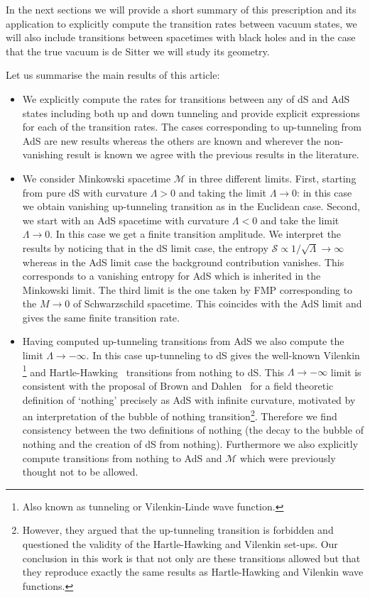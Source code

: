 \documentclass[a4paper,11pt]{article}
\numberwithin{equation}{section}
\def\S{\mathcal S}
\def\M{\mathcal M}
\numberwithin{equation}{section}
\begin{document}
In the next sections we will provide a short summary of this prescription and its application to explicitly compute the transition rates between vacuum states,  we will also include transitions between spacetimes with black holes and in the case that the true vacuum is de Sitter we will study its geometry. 
\vskip 1mm

Let us summarise the main results of this article:

\begin{itemize}
\item We explicitly compute the  rates for transitions between any of  dS and AdS states including both up and down tunneling and provide explicit expressions for each of the transition rates. The cases corresponding to up-tunneling from AdS are new results whereas the others are known and wherever the non-vanishing result is known we  agree with the previous results in the literature.

\item We consider Minkowski spacetime $\M$ in three different limits. First, starting from pure dS with curvature $\Lambda>0$  and taking the limit $\Lambda\rightarrow 0$: in this case we obtain vanishing up-tunneling transition as in the Euclidean case. Second, we start with an AdS spacetime with curvature $\Lambda<0$ and take the limit $\Lambda \rightarrow 0$. In this case we get a finite transition amplitude. We interpret the results by noticing that in the dS limit case, the entropy $\S\propto 1/\sqrt{\Lambda}\rightarrow \infty$ whereas in the AdS limit case the background contribution vanishes. This corresponds  to a vanishing entropy for AdS which is inherited in the Minkowski limit. The third limit is the one taken by FMP corresponding to the $M\rightarrow 0$ of  Schwarzschild spacetime. This coincides with the AdS limit and gives the same finite transition rate.

\item Having computed up-tunneling transitions from AdS we also compute the limit $\Lambda \rightarrow -\infty$. In this case up-tunneling to dS gives the well-known Vilenkin \footnote{Also known as tunneling or Vilenkin-Linde wave function.} and Hartle-Hawking~\cite{Vilenkin:1982de, Hartle:1983ai, Vilenkin:1984wp, Linde:1983mx, Rubakov:1984bh} transitions from nothing to dS. This $\Lambda \rightarrow -\infty$ limit is consistent with the proposal of Brown and Dahlen~\cite{Brown:2011gt} for a field theoretic definition of `nothing' precisely as AdS with infinite curvature, motivated by an interpretation of the bubble of nothing transition\footnote{However, they argued that the up-tunneling transition is forbidden and questioned the validity of the Hartle-Hawking and Vilenkin set-ups. Our conclusion in this work  is that  not only are these transitions  allowed but that they reproduce exactly the same results as Hartle-Hawking and Vilenkin wave functions.}. Therefore we find consistency between the two definitions of nothing (the decay to the bubble of nothing and the creation of dS from nothing). Furthermore we also explicitly compute transitions from nothing to AdS and $\M$ which were previously thought not to be allowed. 


\end{itemize}
\end{document}
